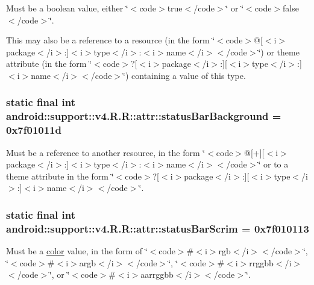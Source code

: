 Must be a boolean value, either \char`\"{}$<$code$>$true$<$/code$>$\char`\"{} or \char`\"{}$<$code$>$false$<$/code$>$\char`\"{}. 

This may also be a reference to a resource (in the form \char`\"{}$<$code$>$@\mbox{[}$<$i$>$package$<$/i$>$:\mbox{]}$<$i$>$type$<$/i$>$:$<$i$>$name$<$/i$>$$<$/code$>$\char`\"{}) or theme attribute (in the form \char`\"{}$<$code$>$?\mbox{[}$<$i$>$package$<$/i$>$:\mbox{]}\mbox{[}$<$i$>$type$<$/i$>$:\mbox{]}$<$i$>$name$<$/i$>$$<$/code$>$\char`\"{}) containing a value of this type. \hypertarget{classandroid_1_1support_1_1v4_1_1_r_1_1attr_5af8973523518de6dd9b1de7e0c62640}{
\subsubsection[{statusBarBackground}]{\setlength{\rightskip}{0pt plus 5cm}static final int android::support::v4.R.R::attr::statusBarBackground = 0x7f01011d}}
\label{classandroid_1_1support_1_1v4_1_1_r_1_1attr_5af8973523518de6dd9b1de7e0c62640}


Must be a reference to another resource, in the form \char`\"{}$<$code$>$@\mbox{[}+\mbox{]}\mbox{[}$<$i$>$package$<$/i$>$:\mbox{]}$<$i$>$type$<$/i$>$:$<$i$>$name$<$/i$>$$<$/code$>$\char`\"{} or to a theme attribute in the form \char`\"{}$<$code$>$?\mbox{[}$<$i$>$package$<$/i$>$:\mbox{]}\mbox{[}$<$i$>$type$<$/i$>$:\mbox{]}$<$i$>$name$<$/i$>$$<$/code$>$\char`\"{}. \hypertarget{classandroid_1_1support_1_1v4_1_1_r_1_1attr_5657e1db89fbe4f4ac02ab9e86e1d735}{
\subsubsection[{statusBarScrim}]{\setlength{\rightskip}{0pt plus 5cm}static final int android::support::v4.R.R::attr::statusBarScrim = 0x7f010113}}
\label{classandroid_1_1support_1_1v4_1_1_r_1_1attr_5657e1db89fbe4f4ac02ab9e86e1d735}


Must be a \hyperlink{classandroid_1_1support_1_1v4_1_1_r_1_1color}{color} value, in the form of \char`\"{}$<$code$>$\#$<$i$>$rgb$<$/i$>$$<$/code$>$\char`\"{}, \char`\"{}$<$code$>$\#$<$i$>$argb$<$/i$>$$<$/code$>$\char`\"{}, \char`\"{}$<$code$>$\#$<$i$>$rrggbb$<$/i$>$$<$/code$>$\char`\"{}, or \char`\"{}$<$code$>$\#$<$i$>$aarrggbb$<$/i$>$$<$/code$>$\char`\"{}. 


